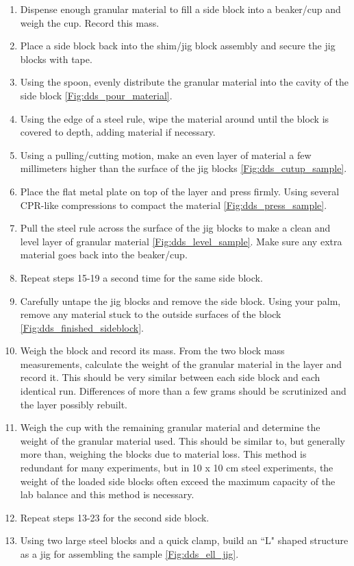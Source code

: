\begin{enumerate}
\item Dispense enough granular material to fill a side block into a beaker/cup and weigh the cup. Record this mass.
\item Place a side block back into the shim/jig block assembly and secure the jig blocks with tape.
\item Using the spoon, evenly distribute the granular material into the cavity of the side block \ref{Fig:dds_pour_material}.
\item Using the edge of a steel rule, wipe the material around until the block is covered to depth, adding material if necessary.
\item Using a pulling/cutting motion, make an even layer of material a few millimeters higher than the surface of the jig blocks \ref{Fig:dds_cutup_sample}.
\item Place the flat metal plate on top of the layer and press firmly. Using several CPR-like compressions to compact the material \ref{Fig:dds_press_sample}.
\item Pull the steel rule across the surface of the jig blocks to make a clean and level layer of granular material \ref{Fig:dds_level_sample}. Make sure any extra material goes back into the beaker/cup.
\item Repeat steps 15-19 a second time for the same side block.
\item Carefully untape the jig blocks and remove the side block. Using your palm, remove any material stuck to the outside surfaces of the block \ref{Fig:dds_finished_sideblock}.
\item Weigh the block and record its mass. From the two block mass measurements, calculate the weight of the granular material in the layer and record it. This should be very similar between each side block and each identical run. Differences of more than a few grams should be scrutinized and the layer possibly rebuilt.
\item Weigh the cup with the remaining granular material and determine the weight of the granular material used. This should be similar to, but generally more than, weighing the blocks due to material loss. This method is redundant for many experiments, but in 10 x 10 cm steel experiments, the weight of the loaded side blocks often exceed the maximum capacity of the lab balance and this method is necessary.
\item Repeat steps 13-23 for the second side block.
\item Using two large steel blocks and a quick clamp, build an ``L" shaped structure as a jig for assembling the sample \ref{Fig:dds_ell_jig}.

\end{enumerate}
